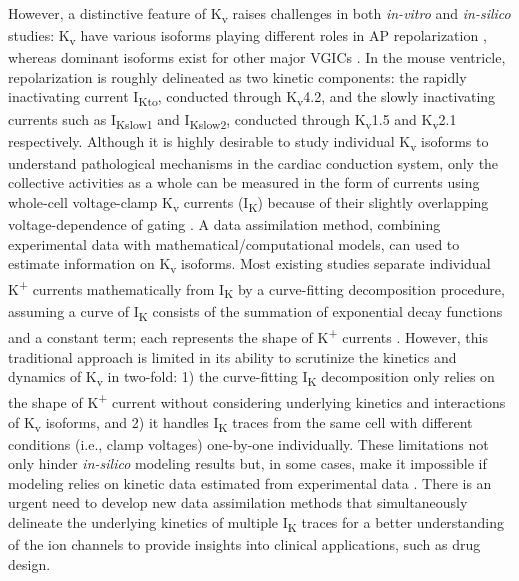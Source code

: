 \documentclass[11pt]{article}
\begin{document}
However, a distinctive feature of K\textsubscript{v} raises challenges in both \textit{in-vitro} and \textit{in-silico} studies: K\textsubscript{v} have various isoforms playing different roles in AP repolarization \citep{nerbonne2005molecular}, whereas dominant isoforms exist for other major VGICs \citep{abriel2010cardiac,benitah2010type}. In the mouse ventricle, repolarization is roughly delineated as two kinetic components: the rapidly inactivating current I\textsubscript{Kto}, conducted through K\textsubscript{v}4.2, and the slowly inactivating currents such as I\textsubscript{Kslow1} and I\textsubscript{Kslow2}, conducted through K\textsubscript{v}1.5 and K\textsubscript{v}2.1 respectively. Although it is highly desirable to study individual K\textsubscript{v} isoforms to understand pathological mechanisms in the cardiac conduction system, only the collective activities as a whole can be measured in the form of currents using whole-cell voltage-clamp K\textsubscript{v} currents (I\textsubscript{K}) because of their slightly overlapping voltage-dependence of gating \citep{brouillette2004functional}. A data assimilation method, combining experimental data with mathematical/computational models, can used to estimate information on K\textsubscript{v} isoforms. Most existing studies separate individual K\textsuperscript{+} currents mathematically from I\textsubscript{K} by a curve-fitting decomposition procedure, assuming a curve of I\textsubscript{K} consists of the summation of exponential decay functions and a constant term; each represents the shape of K\textsuperscript{+} currents \citep{brunet2004heterogeneous}. However, this traditional approach is limited in its ability to scrutinize the kinetics and dynamics of K\textsubscript{v} in two-fold: 1) the curve-fitting I\textsubscript{K} decomposition only relies on the shape of K\textsuperscript{+} current without considering underlying kinetics and interactions of K\textsubscript{v} isoforms, and 2) it handles I\textsubscript{K} traces from the same cell with different conditions (i.e., clamp voltages) one-by-one individually. These limitations not only hinder \textit{in-silico} modeling results but, in some cases, make it impossible if modeling relies on kinetic data estimated from experimental data \citep{kim2022simulation}. There is an urgent need to develop new data assimilation methods that simultaneously delineate the underlying kinetics of multiple I\textsubscript{K} traces for a better understanding of the ion channels to provide insights into clinical applications, such as drug design. 
\end{document}

